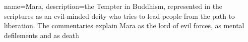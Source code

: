 {
  name=Mara,
  description={the Tempter in Buddhism, represented in the scriptures as an evil-minded deity who tries to lead people from the path to liberation. The commentaries explain Mara as the lord of evil forces, as mental defilements and as death}
}